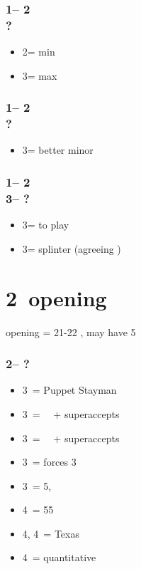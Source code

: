 \subsubsection*{1\nt -- 2\spades\\
                ?}
\begin{itemize}
    \item 2\nt = min
    \item 3\clubs = max
\end{itemize}

\subsubsection*{1\nt -- 2\nt\\
                ?}
\begin{itemize}
    \item 3\minor = better minor
\end{itemize}

\subsubsection*{1\nt -- 2\nt\\
                3\minor -- ?}
\begin{itemize}
    \item 3\diams = to play
    \item 3\major = splinter (agreeing \diams)
\end{itemize}

\section{\texorpdfstring{2\ntx\ opening}{2ntOpening}}\label{sec:2ntOpening}

\alrts{2\nt} opening = 21-22 \bal, may have 5\major

\subsubsection*{2\nt -- ?}
\begin{itemize}
    \item 3\clubs\ = Puppet Stayman
    \item 3\diams\ = \then\ \hearts\ + superaccepts
    \item 3\hearts\ = \then\ \spades\ + superaccepts
    \item 3\spades\ = forces 3\nt
    \item 3\nt\ = 5\hearts, \nf \imp
    \item 4\clubs\ = 55\major
    \item 4\diams, 4\hearts\ = Texas
    \item 4\nt\ = quantitative
\end{itemize}

